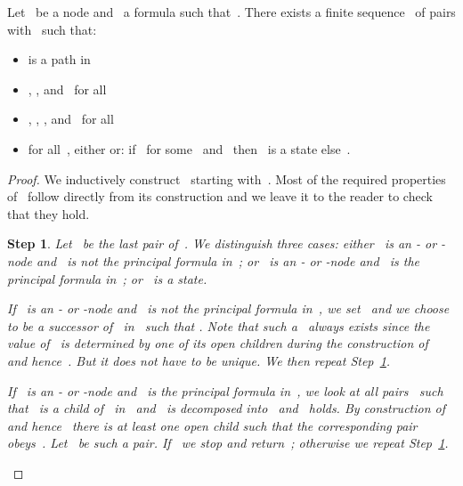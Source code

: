 \documentclass{entcs}
\newtheorem{stp}{Step}
\newenvironment{step}{\vspace{-\lastskip}\par \addvspace{.6pc
    plus .2pc minus .1pc}\begin{stp}\rm}{\end{stp}\par\addvspace{.6pc
    plus .2pc minus .1pc}}
\begin{document}
\begin{center}
\begin{lemma}
  \label{lem_ex_fulfilling}
  Let~ be a node and~ a formula such that~.
  There exists a finite sequence~ of pairs with~ such that:
  \begin{itemize}
  \item  is a path in~
  \item , , and~ for all~
  \item , , , and~ for all~
  \item for all~, either  or:
    if~ for some~ and~
    then~ is a state else~.
  \end{itemize}
\end{lemma}
\begin{proof}
  We inductively construct~ starting with~.
  Most of the required properties of~ follow directly from its construction
  and we leave it to the reader to check that they hold.
  \begin{step}
    \label{step_one}
    Let~ be the last pair of~.
    We distinguish three cases: either~ is an - or -node
    and~ is not the principal formula in~;
    or~ is an - or -node
    and~ is the principal formula in~;
    or~ is a state.

    If~ is an - or -node
    and~ is not the principal formula in~,
    we set~ and we choose~ to be a successor of~ in~
    such that .
    Note that such a~ always exists
    since the value of~
    is determined by one of its open children during the construction of~ and hence~.
    But it does not have to be unique.
    We then repeat Step~\ref{step_one}.

    If~ is an - or -node
    and~ is the principal formula in~,
    we look at all pairs~
    such that~ is a child of~ in~
    and~ is decomposed into~
    and~ holds.
    By construction of~ and hence~ there is at least one open child
    such that the corresponding pair~
    obeys~.
    Let~ be such a pair.
    If~ we stop and return~;
    otherwise we repeat Step~\ref{step_one}.


\end{step}
\end{proof}
\end{center}
\end{document}
